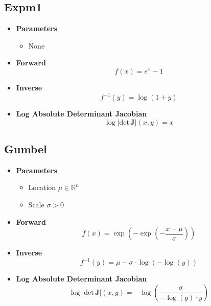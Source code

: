\subsection{Expm1}
\begin{itemize}
  \item \textbf{Parameters}
  \begin{itemize}
    \item None
  \end{itemize}
  \item \textbf{Forward}
  \begin{equation}
    f(x) = e^x - 1
  \end{equation}
  \item \textbf{Inverse}
  \begin{equation}
    f^{-1}(y) = \log ( 1 + y )
  \end{equation}
  \item \textbf{Log Absolute Determinant Jacobian}
  \begin{equation}
    \log \vert \text{det} \, \mathbf{J} \vert (x, y) = x
  \end{equation}
\end{itemize}

\subsection{Gumbel}
\begin{itemize}
  \item \textbf{Parameters}
  \begin{itemize}
    \item Location $\mu \in \mathbb{R}^n$
    \item Scale $\sigma > 0$
  \end{itemize}
  \item \textbf{Forward}
  \begin{equation}
    f(x) = \exp \left( - \exp \left( - \frac{x - \mu}{\sigma} \right) \right)
  \end{equation}
  \item \textbf{Inverse}
  \begin{equation}
    f^{-1}(y) = \mu - \sigma \cdot \log \left( - \log \left( y \right) \right)
  \end{equation}
  \item \textbf{Log Absolute Determinant Jacobian}
  \begin{equation}
    \log \vert \text{det} \, \mathbf{J} \vert (x, y) = - \log \left( \frac{\sigma}{-\log(y) \cdot y} \right)
  \end{equation}
\end{itemize}

